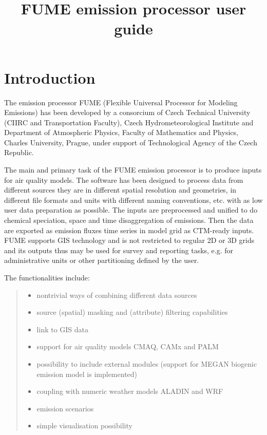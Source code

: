 \documentclass[a4paper,11pt]{article}
\begin{document}
\title{FUME emission processor user guide}
\maketitle

\tableofcontents

\newpage


\section{Introduction}\label{introduction}

The emission processor FUME (Flexible Universal Processor for Modeling Emissions) has been
developed by a consorcium of Czech Technical University (CIIRC and
Transportation Faculty), Czech Hydrometeorological Institute and Department of
Atmospheric Physics, Faculty of Mathematics and Physics, Charles
University, Prague, under support of Technological Agency of the Czech
Republic.

The main and primary task of the FUME emission processor is to produce inputs for air quality
models. The software has been designed to process data from different sources they are in different spatial resolution and geometries, in different file formats and units with different naming conventions, etc. with as low user data preparation as possible. The inputs are preprocessed and unified to do chemical speciation, space and time disaggregation of emissions. Then the data are exported as emission fluxes time series in model grid as CTM-ready inputs. 
FUME supports GIS technology and is not restricted to regular 2D or 3D grids and its
outputs thus may be used for survey and reporting tasks, e.g. for administrative units or other
partitioning defined by the user.

The functionalities include:

\begin{quote}
\begin{itemize}
\item
  nontrivial ways of combining different data sources
\item
  source (spatial) masking and (attribute) filtering capabilities
\item
  link to GIS data
\item
  support for air quality models CMAQ, CAMx and PALM
\item
  possibility to include external modules (support for MEGAN biogenic emission model is implemented)
\item
  coupling with numeric weather models ALADIN and WRF
\item
  emission scenarios
\item
  simple visualisation possibility
\end{itemize}
\end{quote}
\end{document}
